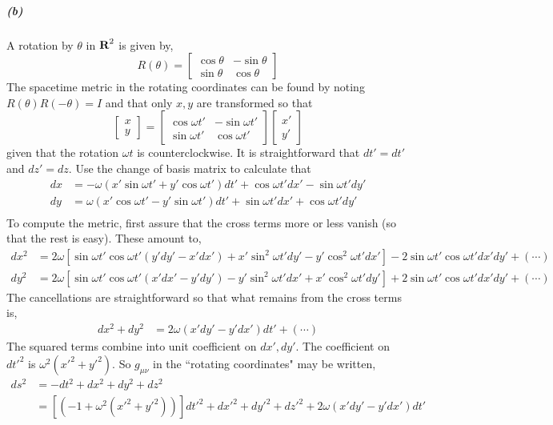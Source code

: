 \documentclass[12pt]{scrartcl}
\newcommand{\reals}{{\mbox{\bfseries R}}}
\begin{document}
\subparagraph{(b)}
A rotation by $\theta$ in $\reals^2$ is given by,
\[R(\theta) = \begin{bmatrix} \cos\theta & -\sin\theta \\ \sin\theta & \cos\theta\end{bmatrix} \]
The spacetime metric in the rotating coordinates can be found by noting $R(\theta) R(-\theta) = I$ and that only $x, y$ are transformed so that 
\[\begin{bmatrix}x\\ y\end{bmatrix} =\begin{bmatrix}\cos{\omega t'} & -\sin{\omega t'}\\ \sin{\omega t'} & \cos{\omega t'}\end{bmatrix}\begin{bmatrix}x'\\ y'\end{bmatrix}\]
given that the rotation $\omega t$ is counterclockwise. It is straightforward that $dt' = dt'$ and $dz' = dz$. Use the change of basis matrix to calculate that
\begin{align*}
	dx &= -\omega(x' \sin{\omega t'} + y' \cos{\omega t'}) dt' + \cos{\omega t'} dx' - \sin{\omega t'} dy' \\
	dy &= \omega(x' \cos{\omega t'} - y' \sin{\omega t'}) dt' + \sin{\omega t'} dx' + \cos{\omega t'} dy' \\
\end{align*}
To compute the metric, first assure that the cross terms more or less vanish (so that the rest is easy). These amount to,
\begin{align*}
dx^2 &= 2\omega\left[\sin{\omega t'}\cos{\omega t'}(y' dy' - x' dx') + x'\sin^2{\omega t'} dy' - y'\cos^2{\omega t'} dx'\right] - 2\sin{\omega t'}\cos{\omega t'} dx' dy'+(\cdots)\\
dy^2 &= 2\omega\left[\sin{\omega t'}\cos{\omega t'}(x' dx' - y' dy') - y'\sin^2{\omega t'} dx' + x'\cos^2{\omega t'} dy'\right] + 2\sin{\omega t'}\cos{\omega t'} dx' dy'+(\cdots)
\end{align*}
The cancellations are straightforward so that what remains from the cross terms is,
\begin{align*}
	dx^2 + dy^2 &= 2\omega(x' dy' - y' dx')dt' + (\cdots)
\end{align*}
The squared terms combine into unit coefficient on  $dx', dy'$. The coefficient on $dt'^2$ is $\omega^2(x'^2 + y'^2)$. So $g_{\mu\nu}$ in the ``rotating coordinates" may be written,
\begin{align*}
	ds^2 &= -dt^2 + dx^2 + dy^2 + dz^2 \\ 
	&=  [(-1 + \omega^2(x'^2 + y'^2))]dt'^2 + dx'^2 + dy'^2 + dz'^2 + 2\omega(x' dy' - y' dx')dt'
\end{align*}
\end{document}
